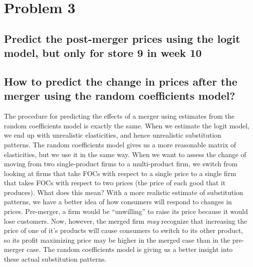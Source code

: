 \documentclass[dvipsnames]{article}
\begin{document}
\newpage
\section*{Problem 3}
\subsection*{Predict the post-merger prices using the logit model, but only for store 9 in week 10}

\begin{table}[htp]
  \centering
  
\end{table}

\subsection*{How to predict the change in prices after the merger using the random coefficients model?}

The procedure for predicting the effects of a merger using estimates from the random coefficients model is exactly the same. When we estimate the logit model, we end up with unrealistic elasticities, and hence unrealistic substitution patterns. The random coefficients model gives us a more reasonable matrix of elasticities, but we use it in the same way. When we want to assess the change of moving from two single-product firms to a multi-product firm, we switch from looking at firms that take FOCs with respect to a single price to a single firm that takes FOCs with respect to two prices (the price of each good that it produces). What does this mean? With a more realistic estimate of substitution patterns, we have a better idea of how consumers will respond to changes in prices. Pre-merger, a firm would be ``unwilling'' to raise its price because it would lose customers. Now, however, the merged firm \emph{may} recognize that increasing the price of one of it's products will cause consumers to switch to its other product, so its profit maximizing price may be higher in the merged case than in the pre-merger case. The random coefficients model is giving us a better insight into these actual substitution patterns.
\end{document}
